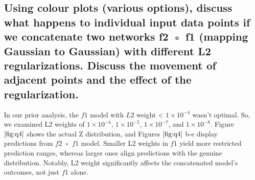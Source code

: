 \documentclass{article}
\begin{document}
\subsection{Using colour plots (various options), discuss what happens to individual
input data points if we concatenate two networks f2 ◦ f1 (mapping
Gaussian to Gaussian) with different L2 regularizations. Discuss the
movement of adjacent points and the effect of the regularization.}
\label{ssec:q4}

In our prior analysis, 
the $f1$ model with $L2$ weight < $1\times10^{-4}$ wasn't optimal. 
So, we examined L2 weights of $1\times10^{-4}$, $1\times10^{-5}$, 
$1\times10^{-7}$, and $1\times10^{-8}$. 
Figure $\ref{fig:q4}$ shows the actual Z distribution, 
and Figures $\ref{fig:q4}$ b-e display predictions from $f2$ ◦ $f1$ model. 
Smaller L2 weights in $f1$ yield more restricted prediction ranges, 
whereas larger ones align predictions with the genuine distribution. 
Notably, L2 weight significantly affects the concatenated model's outcomes, 
not just $f1$ alone.
\end{document}

